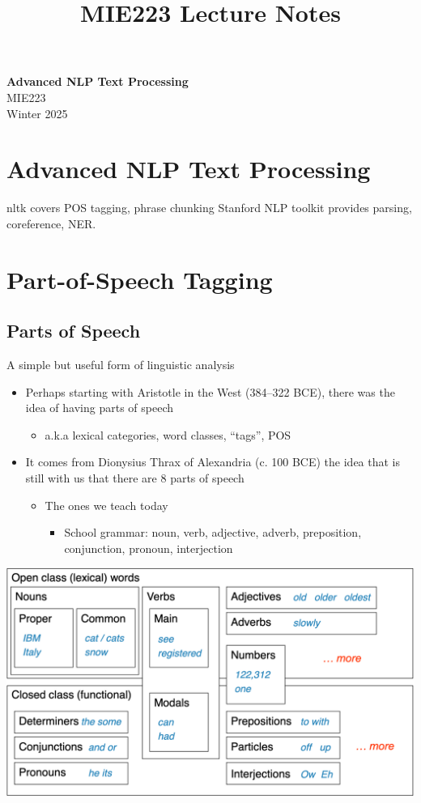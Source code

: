 \documentclass[11pt]{article}
\theoremstyle{definition}
\begin{document}
\setcounter{section}{0}
\title{MIE223 Lecture Notes}

\thispagestyle{empty}

\begin{center}
{\LARGE \bf Advanced NLP Text Processing}\\
{\large MIE223}\\
Winter 2025
\end{center}
\section{Advanced NLP Text Processing}

nltk covers POS tagging,
phrase chunking
Stanford NLP toolkit
provides parsing,
coreference, NER.
\section{Part-of-Speech Tagging}

\subsection{Parts of Speech}
A simple but useful form of
linguistic analysis

\begin{itemize}
  \item Perhaps starting with Aristotle in the West (384–322 BCE), there
  was the idea of having parts of speech
  \begin{itemize}
    \item a.k.a lexical categories, word classes, “tags”, POS
  \end{itemize}
  \item It comes from Dionysius Thrax of Alexandria (c. 100 BCE) the
  idea that is still with us that there are 8 parts of speech
  \begin{itemize}
    \item The ones we teach today
    \begin{itemize}
      \item School grammar: noun, verb, adjective, adverb, preposition,
      conjunction, pronoun, interjection
    \end{itemize}
  \end{itemize}
\end{itemize}

\includegraphics[width=\textwidth/2]{1.png}
\end{document}

